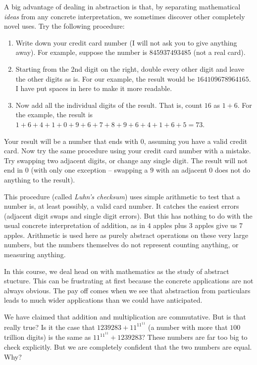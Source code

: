 A big advantage of dealing in abstraction is that, by separating mathematical \emph{ideas} from any concrete interpretation, we sometimes discover other completely novel uses. 
Try the following procedure: 
\begin{enumerate}
	\item Write down your credit card number (I will not ask you to give anything away). For example, suppose the number is $845937493485$ (not a real card). 
	\item Starting from the 2nd digit on the right, double every other digit and leave the other digits as is. For our example, the result would be $16 4 10 9 6 7 8 9 6 4 16 5$. I have put spaces in here to make it more readable.
	\item Now add all the individual digits of the result. That is, count $16$ as $1+6$. For the example, the result is $1+6+4+1+0+9+6+7+8+9+6+4+1+6+5 = 73$. 
\end{enumerate}
Your result will be a number that ends with $0$, assuming you have a valid credit card.
Now try the same procedure using your credit card number with a mistake. Try swapping two adjacent digits, or change any single digit.
The result will not end in $0$ (with only one exception -- swapping a $9$ with an adjacent $0$ does not do anything to the result).

This procedure (called \emph{Luhn's checksum}) uses simple arithmetic to test that a number is, at least possibly, a valid card number. 
It catches the easiest errors (adjacent digit swaps and single digit errors).
But this has nothing to do with the usual concrete interpretation of addition, as in $4$ apples plus $3$ apples give us $7$ apples.
Arithmetic is used here as purely abstract operations on these very large numbers, but the numbers themselves do not represent counting anything, or measuring anything. 

In this course, we deal head on with mathematics as the study of abstract stucture.
This can be frustrating at first because the concrete applications are not always obvious.
The pay off comes when we see that abstraction from particulars leads to much wider applications than we could have anticipated.

We have claimed that addition and multiplication are commutative.
But is that really true? Is it the case that $1239283 + 11^{11^11}$ (a number with more that $100$ trillion digits) is the same as $11^{11^11} + 1239283$?
These numbers are far too big to check explicitly.
But we are completely confident that the two numbers are equal.
Why? 

